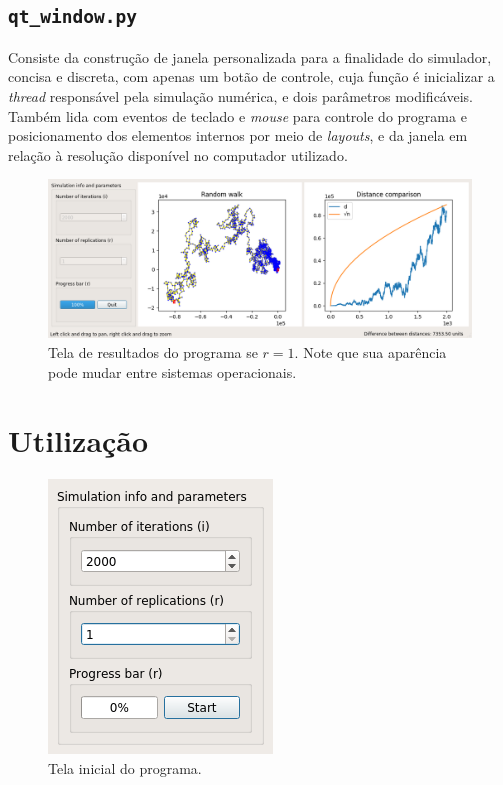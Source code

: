 \documentclass{article}
\begin{document}
\subsection{\texttt{qt\_window.py}}

Consiste da construção de janela personalizada para a finalidade do simulador,
concisa e discreta, com apenas um botão de controle, cuja função é inicializar
a \emph{thread} responsável pela simulação numérica, e dois parâmetros
modificáveis. Também lida com eventos de teclado e \emph{mouse} para controle
do programa e posicionamento dos elementos internos por meio de \emph{layouts},
e da janela em relação à resolução disponível no computador utilizado.

\begin{figure}[htbp]
    \centering
    \includegraphics[scale=0.4]{example_run.png}
    \caption{Tela de resultados do programa se $r = 1$. Note que sua aparência
    pode mudar entre sistemas operacionais.}
\end{figure}

\section{Utilização}

\begin{figure}
    \centering
    \includegraphics[scale=0.65]{program.png}
    \caption{Tela inicial do programa.}
\end{figure}
\end{document}
